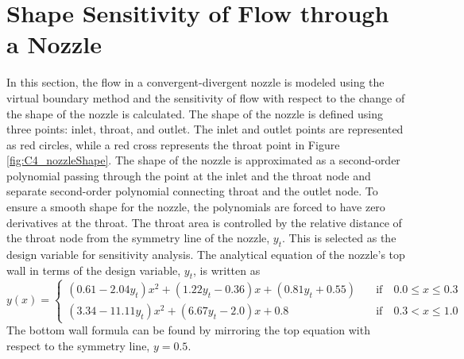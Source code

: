 \section{Shape Sensitivity of Flow through a Nozzle}
In this section, the flow in a convergent-divergent nozzle is modeled using the virtual boundary method and the sensitivity of flow with respect to the change of the shape of the nozzle is calculated.  The shape of the nozzle is defined using three points: inlet, throat, and outlet. The inlet and outlet points are represented as red circles, while a red cross represents the throat point in Figure \ref{fig:C4_nozzleShape}. The shape of the nozzle is approximated as a second-order polynomial passing through the point at the inlet and the throat node and separate second-order polynomial connecting throat and the outlet node. To ensure a smooth shape for the nozzle, the polynomials are forced to have zero derivatives at the throat. The throat area is controlled by the relative distance of the throat node from the symmetry line of the nozzle, $y_t$. This is selected as the design variable for sensitivity analysis. The analytical equation of the nozzle's top wall in terms of the design variable, $y_t$, is written as
%
\begin{equation}
	y(x) = 
	\begin{cases}
		(0.61 - 2.04 y_t)x^2 + (1.22y_t - 0.36) x + (0.81y_t + 0.55) \quad &\text{if} \quad 0.0 \leq x \leq 0.3 \\
		(3.34 - 11.11 y_t)x^2 + (6.67y_t - 2.0)x + 0.8 \quad &\text{if} \quad 0.3 < x \leq 1.0
	\end{cases}
\end{equation}
%
The bottom wall formula can be found by mirroring the top equation with respect to the symmetry line, $y = 0.5$.

